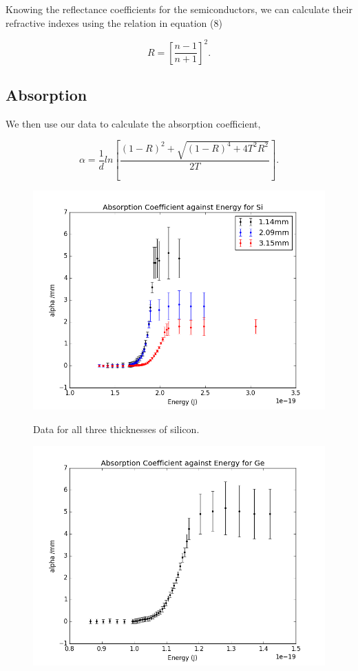 \documentclass{article}
\begin{document}
Knowing the reflectance coefficients for the semiconductors, we can calculate their refractive indexes using the relation in equation (8)

\begin{equation}
	R = [\frac{n-1}{n+1}]^2.
\end{equation}

\subsection{Absorption}

We then use our data to calculate the absorption coefficient,

\begin{equation}
	\alpha = \frac{1}{d} ln[\frac{(1-R)^2 + \sqrt{(1-R)^4 + 4T^2 R^2}}{2T}].
\end{equation}

\begin{figure}[!htb]
	\centering
	\includegraphics[scale=.75]{plots/Si_alpha.png}
 	\label{Si_a}
	\caption{Data for all three thicknesses of silicon.}
\end{figure}

\begin{figure}[!htb]
	\centering
	\includegraphics[scale=.75]{plots/Ge_alpha.png}
 	\label{Ge_a}
\end{figure}
\end{document}
